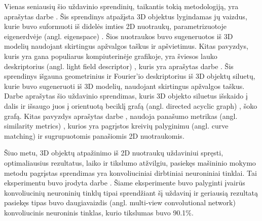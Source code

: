 Vienas seniausių šio uždavinio sprendinių, taikantis tokią metodologiją, yra aprašytas darbe \cite{prevWparEig}. Šis sprendinys atpažįsta 3D objektus lygindamas jų vaizdus, kurie buvo suformuoti iš didelės imties 2D nuotraukų, parametrizuotoje 
eigenerdvėje (angl. eigenspace) %
. Šios nuotraukos buvo sugeneruotos iš 3D modelių naudojant skirtingus apžvalgos taškus ir apšvietimus. 
Kitas pavyzdys, kuris yra gana populiarus kompiuterinėje grafikoje, yra 
šviesos lauko deskriptorius (angl. light field descriptor)%
, kuris yra aprašytas darbe \cite{prevWLightFld}. Šis sprendinys išgauna geometrinius ir 
Fourier'io %
deskriptorius iš 3D objektų siluetų, kurie buvo sugeneruoti iš 3D modelių, naudojant skirtingus apžvalgos taškus. 
Darbe \cite{prevWShockGraph} aprašytas šio uždavinio sprendimas, kuris 3D objekto siluetus išskaido į dalis ir išsaugo juos į 
orientuotą beciklį grafą (angl. directed acyclic graph) %
, šoko grafą. %
Kitas pavyzdys aprašytas darbe \cite{prevWSimMet}, naudoja panašumo metrikas (angl. similarity metrics) %
, kurios yra pagrįstos kreivių palyginimu (angl. curve matching)%
ir sugrupuotomis panašiomis 2D nuotraukomis.

Šiuo metu, 3D objektų atpažinimo iš 2D nuotraukų uždaviniui spręsti, optimaliausius  rezultatus, laiko ir tikslumo atžvilgiu, pasiekęs mašininio mokymo metodu pagrįstas sprendimas yra konvoliuciniai dirbtiniai neuroniniai tinklai. Tai eksperimentu buvo įrodyta darbe \cite{cnnExp1}. Šiame eksperimente buvo palyginti įvairūs konvoliucinių neuroninių tinklų tipai sprendžiant šį uždavinį ir geriausią rezultatą pasiekęs tipas buvo
daugiavaizdis (angl. multi-view convolutional network)%
konvoliucinis neuroninis tinklas, kurio tikslumas buvo 90.1\%.